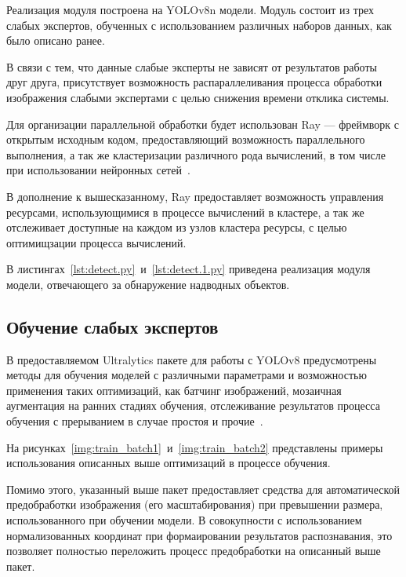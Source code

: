 Реализация модуля построена на YOLOv8n модели. Модуль состоит из трех слабых экспертов, обученных с использованием различных наборов данных, как было описано ранее.

В связи с тем, что данные слабые эксперты не зависят от результатов работы друг друга, присутствует возможность распараллеливания процесса обработки изображения слабыми экспертами с целью снижения времени отклика системы.

Для организации параллельной обработки будет использован Ray --- фреймворк с открытым исходным кодом, предоставляющий возможность параллельного выполнения, а так же кластеризации различного рода вычислений, в том числе при использовании нейронных сетей~\cite{pkg-ray}.

В дополнение к вышесказанному, Ray предоставляет возможность управления ресурсами, использующимися в процессе вычислений в кластере, а так же отслеживает доступные на каждом из узлов кластера ресурсы, с целью оптимищзации процесса вычислений.

В листингах~\ref{lst:detect.py}~и~\ref{lst:detect.1.py} приведена реализация модуля модели, отвечающего за обнаружение надводных объектов.


\subsection{Обучение слабых экспертов}

В предоставляемом Ultralytics пакете для работы с YOLOv8 предусмотрены методы для обучения моделей с различными параметрами и возможностью применения таких оптимизаций, как батчинг изображений, мозаичная аугментация на ранних стадиях обучения, отслеживание результатов процесса обучения с прерыванием в случае простоя и прочие~\cite{pkg-ultralytics}.

На рисунках~\ref{img:train_batch1}~и~\ref{img:train_batch2} представлены примеры использования описанных выше оптимизаций в процессе обучения.



Помимо этого, указанный выше пакет предоставляет средства для автоматической предобработки изображения (его масштабирования) при превышении размера, использованного при обучении модели. В совокупности с использованием нормализованных координат при формаировании результатов распознавания, это позволяет полностью переложить процесс предобработки на описанный выше пакет.

